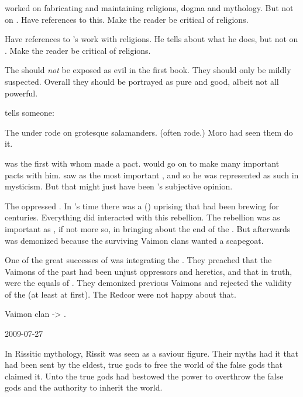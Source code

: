 \Menessiaraid worked on fabricating and maintaining religions, dogma and mythology. 
But not on \Azmith. 
Have references to this. 
Make the reader be critical of religions. 

Have references to \Menessiaraid's work with religions.
He tells \Teshrial about what he does, but not on \Azmith.
Make the reader be critical of religions. 

The \sephiroth should \emph{not} be exposed as evil in the first book. 
They should only be mildly suspected.
Overall they should be portrayed as pure and good, albeit not all powerful. 

\Psyrex tells someone: 


The \quiljaaran under \Yormis rode on grotesque salamanders. 
(\QuilJaaran often rode.)
Moro \Cobrel had seen them do it. 


\RuinSatha was the first \xs with whom \Sethicus made a pact. 
\Sethicus would go on to make many important pacts with him. 
\Sethicus saw \RuinSatha as the most important \xs, and so he was represented as such in \draconian mysticism. 
But that might just have been \Sethicus's subjective opinion. 



The \VaimonCaliphate oppressed \scathae. 
In \Belzir's time there was a \scathaese (\Ortaican) uprising that had been brewing for centuries. 
Everything \Belzir did interacted with this rebellion. 
The rebellion was as important as \Belzir, if not more so, in bringing about the end of the \caliphate. 
But afterwards \Belzir was demonized because the surviving Vaimon clans wanted a scapegoat. 

One of the great successes of \ClanTelcra was integrating the \scathae. 
They preached that the Vaimons of the past had been unjust oppressors and heretics, and that in truth, \scathae were the equals of \humans. 
They demonized previous Vaimons and rejected the validity of the \caliphate (at least at first).
The Redcor were not happy about that. 


Vaimon clan -> \Vaimonclan. 



2009-07-27

In Rissitic mythology, Rissit \Nechsain was seen as a saviour figure. 
Their myths had it that \Nechsain had been sent by the eldest, true gods to free the world of the false gods that claimed it.
Unto \Nechsain the true gods had bestowed the power to overthrow the false gods and the authority to inherit the world. 

